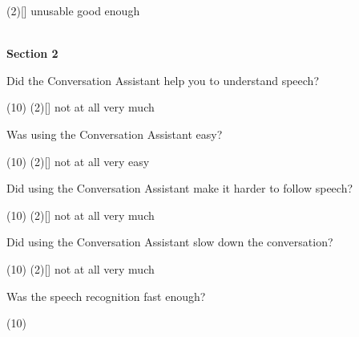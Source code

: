 \documentclass[english, 12pt, a4paper, pdftex, elec, utf8]{aaltothesis}
\begin{document}
{\begin{questionnaire}[resume]
\begin{tasks}[]
            \task*(2)[] unusable
            \task[] good enough \\\\
        \end{tasks}
    \end{questionnaire}
    \noindent
    \hspace{0.35cm}
    \textbf{Section 2}
    \vspace{0.15cm}
    \begin{questionnaire}[resume]
        \item Did the Conversation Assistant help you to understand speech?
        \begin{tasks}[](10)
            \task*(2)[] not at all
            \task[] very much
        \end{tasks}
        \item Was using the Conversation Assistant easy?
        \begin{tasks}[](10)
            \task*(2)[] not at all
            \task[] very easy
        \end{tasks}
        \item Did using the Conversation Assistant make it harder to follow speech?
        \begin{tasks}[](10)
            \task*(2)[] not at all
            \task[] very much
        \end{tasks}
        \item Did using the Conversation Assistant slow down the conversation?
        \begin{tasks}[](10)
            \task*(2)[] not at all
            \task[] very much
        \end{tasks}
        \item Was the speech recognition fast enough?
        \begin{tasks}[](10)

\end{tasks}
\end{questionnaire}}
\end{document}
